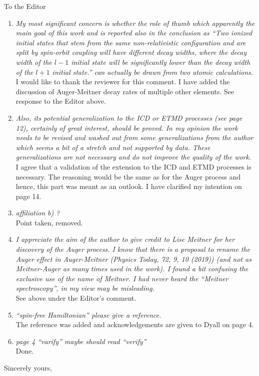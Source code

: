 \documentclass[DIN,pagenumber=false,parskip=half,fromalign=left,fromphone=false,fromemail=true,fromurl=false,fromlogo=false,fromrule=false]{scrlttr2}
\begin{document}
\begin{letter}{To the Editor}
\begin{enumerate}
 \item \emph{My most significant concern is whether the role of thumb which apparently
             the main goal of this work and is reported also in the conclusion as
             ``Two ionized initial states that stem
             from the same non-relativistic configuration and are split by
             spin-orbit coupling will have
             different decay widths, where the decay width of the $l - 1$ initial
             state will be significantly
             lower than the decay width of the $l + 1$ initial state.''
             can actually be drawn from two atomic calculations.}\\
             I would like to thank the reviewer for this comment.
             I have added the discussion of Auger-Meitner decay rates of multiple
             other elements.
             See response to the Editor above.
 \item \emph{Also, its potential generalization to the ICD or ETMD processes
             (see page 12), certainly of great interest,
             should be proved.
             In my opinion the work needs to be revised and washed out from some
             generalizations from the author
             which seems a bit of a stretch and not supported by data.
             These generalizations are not necessary and do not improve the quality
             of the work.}\\
             I agree that a validation of the extension to the ICD and ETMD processes
             is necessary. The reasoning would be the same as for the Auger process
             and hence, this part was meant as an outlook. I have clarified my intention
             on page 14.
 \item \emph{affiliation b) ?}\\
       Point taken, removed.
 \item \emph{I appreciate the aim of the author to give credit to Lise Meitner for
             her discovery of the Auger process. I know that there is a proposal
             to rename the Auger effect in
             Auger-Meitner (Physics Today, 72, 9, 10 (2019)) (and not as Meitner-Auger
             as many times used in the work).
             I found a bit confusing the exclusive use of the name of Meitner.
             I had never heard the
             ``Meitner spectroscopy'', in my view may be misleading.}\\
      See above under the Editor's comment.
\item \emph{``spin-free Hamiltonian'' please give a reference.}\\
      The reference was added and acknowledgements are given to Dyall on page 4.
\item \emph{page 4 ``varify'' maybe should read ``verify''}\\
      Done.
\end{enumerate}

        \closing{Sincerely yours,}
	\end{letter}
\end{document}
